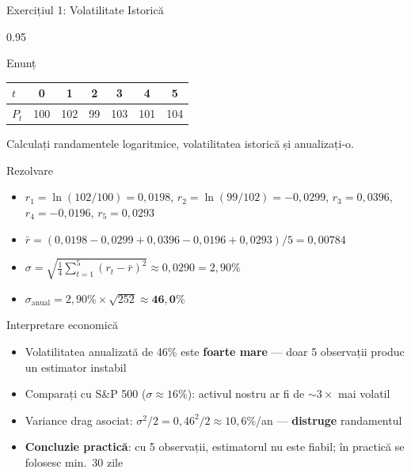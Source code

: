 \documentclass[9pt, aspectratio=169, t]{beamer}
\begin{document}
\begin{frame}[shrink=20]{Exercițiul 1: Volatilitate Istorică}
    \begin{cminipage}{0.95\textwidth}
    \begin{block}{Enunț}
    \begin{center}
    {\small\renewcommand{\arraystretch}{1.3}
    \begin{tabular}{lcccccc}
    \toprule
    $t$ & 0 & 1 & 2 & 3 & 4 & 5 \\
    \midrule
    $P_t$ & 100 & 102 & 99 & 103 & 101 & 104 \\
    \bottomrule
    \end{tabular}}
    \end{center}
    Calculați randamentele logaritmice, volatilitatea istorică și anualizați-o.
    \end{block}
    \vspace{0.1cm}
    \begin{exampleblock}{Rezolvare}
    \begin{itemize}\setlength{\itemsep}{0pt}
        \item $r_1 = \ln(102/100) = 0{,}0198$, \; $r_2 = \ln(99/102) = -0{,}0299$, \; $r_3 = 0{,}0396$, \; $r_4 = -0{,}0196$, \; $r_5 = 0{,}0293$
        \item $\bar{r} = (0{,}0198 - 0{,}0299 + 0{,}0396 - 0{,}0196 + 0{,}0293)/5 = 0{,}00784$
        \item $\sigma = \sqrt{\frac{1}{4}\sum_{t=1}^{5}(r_t - \bar{r})^2} \approx 0{,}0290 = 2{,}90\%$
        \item $\sigma_{\text{anual}} = 2{,}90\% \times \sqrt{252} \approx \mathbf{46{,}0\%}$
    \end{itemize}
    \end{exampleblock}
    \begin{alertblock}{Interpretare economică}
    \begin{itemize}\setlength{\itemsep}{0pt}
        \item Volatilitatea anualizată de 46\% este \textbf{foarte mare} --- doar 5 observații produc un estimator instabil
        \item Comparați cu S\&P 500 ($\sigma \approx 16\%$): activul nostru ar fi de $\sim 3\times$ mai volatil
        \item Variance drag asociat: $\sigma^2/2 = 0{,}46^2/2 \approx 10{,}6\%$/an --- \textbf{distruge} randamentul
        \item \textbf{Concluzie practică}: cu 5 observații, estimatorul nu este fiabil; în practică se folosesc min.\ 30 zile
    \end{itemize}
    \end{alertblock}
    \end{cminipage}
\end{frame}
\end{document}
